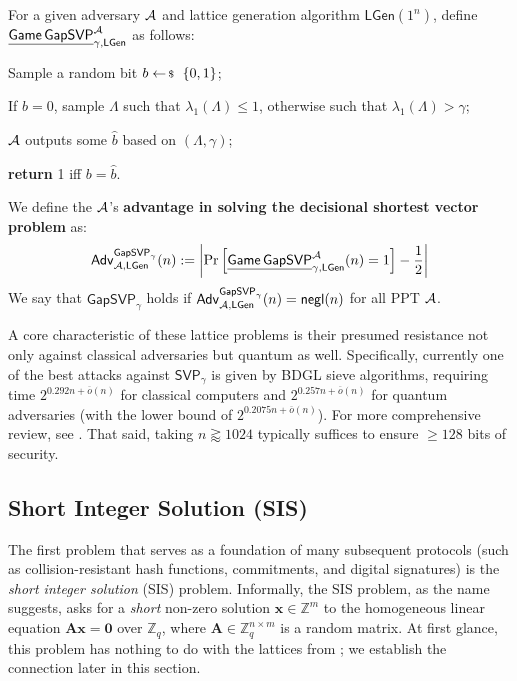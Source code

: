 \documentclass[../../book.tex]{subfiles}
\begin{document}
\begin{definition}\label{def:gap-cvp} For a given adversary
    $\mathcal{A}$ and lattice generation algorithm $\mathsf{LGen}(1^{n})$,
    define
    $\underline{\mathsf{Game}\,\mathsf{GapSVP}}^{\mathcal{A}}_{\gamma,\mathsf{LGen}}$
    as follows:
    \begin{algoen}
        \item Sample a random bit $b \leftarrowS \{0,1\}$;
        \item If $b=0$, sample $\Lambda$ such that $\lambda_1(\Lambda) \leq 1$,
        otherwise such that $\lambda_1(\Lambda) > \gamma$;
        \item $\mathcal{A}$ outputs some $\widehat{b}$ based on
        $(\Lambda,\gamma)$;
        \item \textbf{return} 1 iff $b=\widehat{b}$.
    \end{algoen}
    We define the $\mathcal{A}$'s \textbf{advantage in solving the decisional
    shortest vector problem} as:
    \begin{equation*}
        \mathsf{Adv}^{\mathsf{GapSVP}_{\gamma}}_{\mathcal{A},\mathsf{LGen}}(n) := \left|\Pr\left[\underline{\mathsf{Game}\,\mathsf{GapSVP}}^{\mathcal{A}}_{\gamma,\mathsf{LGen}}(n) = 1\right] - \frac{1}{2}\right|
    \end{equation*} 
    We say that $\mathsf{GapSVP}_{\gamma}$ holds if
    $\mathsf{Adv}^{\mathsf{GapSVP}_{\gamma}}_{\mathcal{A},\mathsf{LGen}}(n)=\mathsf{negl}(n)$
    for all PPT $\mathcal{A}$.
\end{definition}

\begin{remark}
    A core characteristic of these lattice problems is their presumed resistance not only against classical adversaries but quantum as well. 
    Specifically, currently one of the best attacks against $\mathsf{SVP}_{\gamma}$ is given by BDGL sieve algorithms, requiring time $2^{0.292n+\overline{o}(n)}$ for classical computers and $2^{0.257n+\overline{o}(n)}$ for quantum adversaries (with the lower bound of $2^{0.2075n+\overline{o}(n)}$).
    For more comprehensive review, see \cite{KoenWessel25}.
    That said, taking $n \gtrapprox 1024$ typically suffices to ensure $\geq 128$ bits of security.
\end{remark}

\subsection{Short Integer Solution (SIS)}\label{section:sis}

The first problem that serves as a foundation of many subsequent protocols (such as collision-resistant hash functions, commitments, and digital signatures) is the \textit{short integer solution} (SIS) problem.
Informally, the SIS problem, as the name suggests, asks for a \emph{short} non-zero solution $\mathbf{x} \in \mathbb{Z}^m$ to the homogeneous linear equation $\mathbf{A}\mathbf{x} = \mathbf{0}$ over $\mathbb{Z}_q$, where $\mathbf{A} \in \mathbb{Z}_q^{n \times m}$ is a random matrix.
At first glance, this problem has nothing to do with the lattices from ; we establish the connection later in this section.
 
\end{document}
